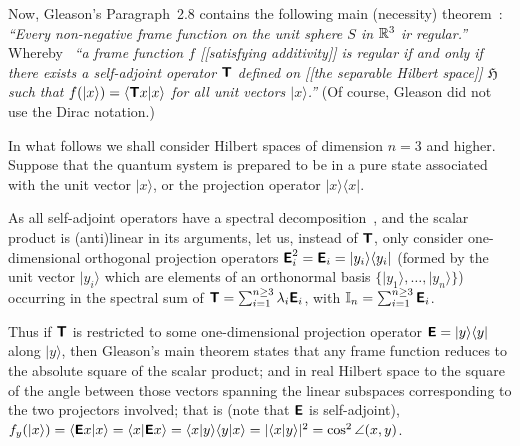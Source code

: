 \documentclass[%
  twocolumn,
 showpacs,
 showkeys,
 preprintnumbers,
 amsmath,amssymb,
 aps,
  pra,
  longbibliography,
 floatfix,
 ]{revtex4-1}
\begin{document}
Now, Gleason's Paragraph~2.8 contains the following main (necessity) theorem~\cite[p.~888]{Gleason}:
{\em ``Every non-negative frame function on the unit sphere $S$ in ${\Bbb R}^3$
ir regular.''}
Whereby~\cite[p.~886]{Gleason}
{\em ``a frame function $f$ [[satisfying additivity]]
is regular if and only if there exists a self-adjoint
operator $\textsf{\textbf{T}}$ defined on [[the separable Hilbert space]] $\mathfrak{H}$ such that
$f( \vert x \rangle ) = \langle \textsf{\textbf{T}}x \vert x\rangle$ for all unit vectors $ \vert x \rangle $.''}
(Of course, Gleason did not use the Dirac notation.)

In what follows we shall consider Hilbert spaces of dimension $n=3$ and higher.
Suppose that the quantum system is prepared to be in a
pure state associated with the unit vector $\vert x \rangle$,
or the projection operator $\vert x \rangle \langle x \vert$.

As all self-adjoint operators have a spectral decomposition~\cite[\S~79]{halmos-vs},
and the scalar product is (anti)linear in its arguments,
let us, instead of $\textsf{\textbf{T}}$, only consider one-dimensional orthogonal projection operators
$\textsf{\textbf{E}}_i^2=\textsf{\textbf{E}}_i = \vert y_i \rangle \langle y_i \vert$
(formed by the unit vector $ \vert y_i \rangle $ which are elements of an orthonormal basis
$\{  \vert y_1 \rangle , \ldots ,  \vert y_n \rangle \}$)
occurring in the spectral sum of
$\textsf{\textbf{T}}=\sum_{i=1}^{n\ge 3} \lambda_i \textsf{\textbf{E}}_i$,
with
${\Bbb I}_n =\sum_{i=1}^{n\ge 3} \textsf{\textbf{E}}_i$.

Thus if $\textsf{\textbf{T}}$ is restricted to some one-dimensional projection operator
$\textsf{\textbf{E}} = \vert y \rangle \langle y \vert$ along $\vert y \rangle $,
then Gleason's main theorem
states that any frame function
reduces to the absolute square of the scalar product;
and in real Hilbert space to the square of the angle between those vectors spanning the linear subspaces corresponding to the two projectors involved;
that is (note that $\textsf{\textbf{E}}$ is self-adjoint),
$f_y( \vert x \rangle ) =
\langle \textsf{\textbf{E}}x \vert x\rangle  =
\langle x \vert \textsf{\textbf{E}} x\rangle  =
\langle x \vert y \rangle \langle y \vert x\rangle  =
\vert \langle x \vert y \rangle
\vert^2 = \cos^2 \angle (x,y)$.
\end{document}
